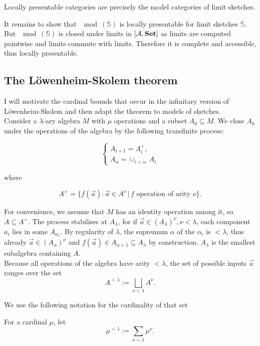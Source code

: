 \begin{Corollary}
Locally presentable categories are precisely the model categories of limit sketches.
\end{Corollary}
\begin{Proof}
It remains to show that $\mod(\mathbb S)$ is locally presentable for limit sketches $\mathbb S$. But $\mod(\mathbb S)$ is closed under limits in $[\mathcal{A},\mathbf{Set}]$ as limits are computed pointwise and limits commute with limits. Therefore it is complete and accessible, thus locally presentable.
\end{Proof}

\subsection{The Löwenheim-Skolem theorem}

I will motivate the cardinal bounds that occur in the infinitary version of Löwenheim-Skolem and then adapt the theorem to models of sketches. \\

Consider a $\lambda$-ary algebra $M$ with $\mu$ operations and a subset $A_0 \subseteq M$. We close $A_0$ under the operations of the algebra by the following transfinite process:

\[
\begin{cases}
A_{i+1} = A_i^+, \\
A_{\alpha} = \cup_{i < \alpha}\,A_i
\end{cases}
\]

where

\[ A^+ = \{ f(\vec a) : \vec a \in A^\nu \, | \, f \text{ operation of arity } \nu \}. \] 

For convenience, we assume that $M$ has an identity operation among it, so $A \subseteq A^+$. The process stabilises at $A_\lambda$, for if $\vec a \in (A_\lambda)^\nu, \nu < \lambda$, each component $a_i$ lies in some $A_{\alpha_i}$. By regularity of $\lambda$, the supremum $\alpha$ of the $\alpha_i$ is $< \lambda$, thus already $\vec a \in (A_\alpha)^\nu$ and $f(\vec a) \in A_{\alpha+1} \subseteq A_\lambda$ by construction. $A_\lambda$ is the smallest subalgebra containing $A$. \\

Because all operations of the algebra have arity $< \lambda$, the set of possible inputs $\vec a$ ranges over the set
\[ A^{< \lambda} := \bigsqcup_{\nu < \lambda} A^\nu. \]

We use the following notation for the cardinality of that set
\begin{Definition}
For a cardinal $\mu$, let
\[ \mu^{< \lambda} := \sum_{\nu < \lambda} \mu^\nu. \]
\end{Definition}

